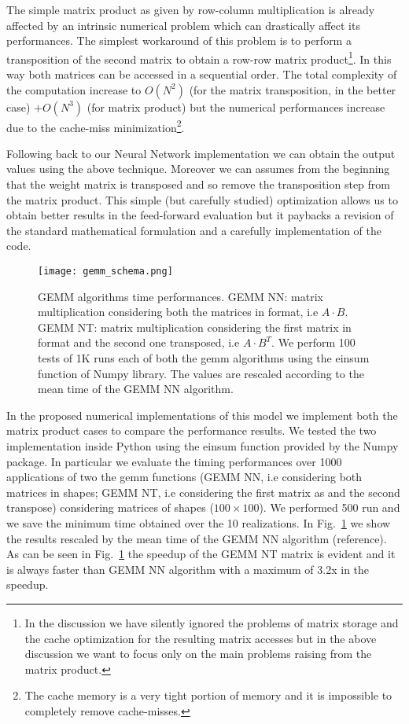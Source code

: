 \documentclass{standalone}
\begin{document}
The simple matrix product as given by row-column multiplication is already affected by an intrinsic numerical problem which can drastically affect its performances.
The simplest workaround of this problem is to perform a transposition of the second matrix to obtain a row-row matrix product\footnote{
  In the discussion we have silently ignored the problems of matrix storage and the cache optimization for the resulting matrix accesses but in the above discussion we want to focus only on the main problems raising from the matrix product.
}.
In this way both matrices can be accessed in a sequential order.
The total complexity of the computation increase to $O(N^2)$ (for the matrix transposition, in the better case) $+ O(N^3)$ (for matrix product) but the numerical performances increase due to the cache-miss minimization\footnote{
  The cache memory is a very tight portion of memory and it is impossible to completely remove cache-misses.
}.

Following back to our Neural Network implementation we can obtain the output values using the above technique.
Moreover we can assumes from the beginning that the weight matrix is transposed and so remove the transposition step from the matrix product.
This simple (but carefully studied) optimization allows us to obtain better results in the feed-forward evaluation but it paybacks a revision of the standard mathematical formulation and a carefully implementation of the code.

\begin{figure}[htbp]
\texttt{[image: gemm\_schema.png]}
\quad
\centering
\def\svgwidth{0.45\textwidth}

\caption{GEMM algorithms time performances.
GEMM NN: matrix multiplication considering both the matrices in  format, i.e $A\cdot B$.
GEMM NT: matrix multiplication considering the first matrix in  format and the second one transposed, i.e $A\cdot B^T$.
We perform 100 tests of 1K runs each of both the gemm algorithms using the \textsf{einsum} function of Numpy library.
The values are rescaled according to the mean time of the GEMM NN algorithm.
}
\label{fig:gemm}
\end{figure}

In the proposed numerical implementations of this model we implement both the matrix product cases to compare the performance results.
We tested the two implementation inside Python using the \textsf{einsum} function provided by the Numpy package.
In particular we evaluate the timing performances over 1000 applications of two the gemm functions (GEMM NN, i.e considering both matrices in  shapes; GEMM NT, i.e considering the first matrix as  and the second transpose) considering matrices of shapes ($100\times100$).
We performed 500 run and we save the minimum time obtained over the 10 realizations.
In Fig.~\ref{fig:gemm} we show the results rescaled by the mean time of the GEMM NN algorithm (reference).
As can be seen in Fig.~\ref{fig:gemm} the speedup of the GEMM NT matrix is evident and it is always faster than GEMM NN algorithm with a maximum of 3.2x in the speedup.
\end{document}
